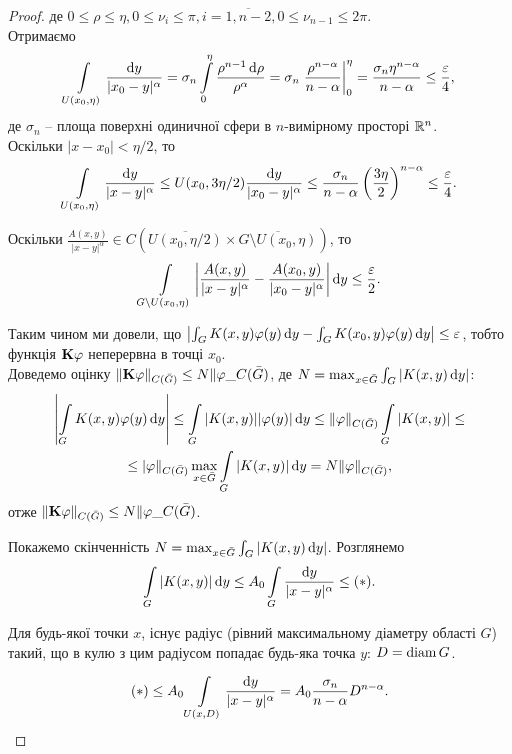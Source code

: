 \begin{proof}
	де $0 \le \rho \le \eta, 0 \le \nu_i \le \pi, i = \overline{1, n - 2}, 0 \le \nu_{n - 1} \le 2 \pi$. \\

	Отримаємо \[ \Int_{U(x_0, \eta)} \dfrac{\diff y}{|x_0 - y|^\alpha} = \sigma_n \Int_0^\eta \dfrac{\rho^{n - 1} \diff \rho}{\rho^\alpha} = \sigma_n \left.\dfrac{\rho^{n - \alpha}}{n - \alpha}\right|_0^\eta = \dfrac{\sigma_n \eta^{n - \alpha}}{n - \alpha} \le \dfrac{\epsilon}{4}, \]
	де $\sigma_n$ -- площа поверхні одиничної сфери в $n$-вимірному просторі $\RR^n$. \\

	Оскільки $|x - x_0| < \eta / 2$, то \[ \Int_{U(x_0, \eta)} \dfrac{\diff y}{|x - y|^\alpha} \le {U(x_0, 3\eta/2)} \dfrac{\diff y}{|x_0 - y|^\alpha} \le \dfrac{\sigma_n}{n - \alpha} \left(\dfrac{3\eta}{2}\right)^{n - \alpha} \le \dfrac{\epsilon}{4}. \] 

	Оскільки $\frac{A(x, y)}{|x - y|^\alpha} \in C\left(\overline{U (x_0, \eta/2)}\times\overline{G \setminus U (x_0, \eta)}\right)$, то
	\[ \Int_{G \setminus U(x_0, \eta)} \left|\dfrac{A(x, y)}{|x - y|^\alpha} - \dfrac{A(x_0, y)}{|x_0 - y|^\alpha}\right| \diff y \le \dfrac{\epsilon}{2}. \]

	Таким чином ми довели, що $\left| \int_G K(x, y) \phi(y) \diff y - \int_G K(x_0, y) \phi(y) \diff y \right| \le \epsilon$, тобто функція $\bf{K}\phi$ неперервна в точці $x_0$. \\

	Доведемо оцінку $\| \bf{K}\phi \|_{C(\bar G)} \le N \|\phi\_{C(\bar G)}$, де $N = \max_{x \in \bar G} \int_G |K(x, y) \diff y|$:
	\begin{multline*}
		\left| \Int_G K(x, y) \phi(y) \diff y \right| \le \Int_G |K(x, y)| |\phi(y)| \diff y \le \|\phi\|_{C(\bar G)} \Int_G |K(x, y)| \le \\
		\le |\phi\|_{C(\bar G)} \Max_{x \in \bar G} \Int_G |K(x, y)| \diff y = N \|\phi\|_{C(\bar G)},
	\end{multline*}
	отже $\| \bf{K}\phi \|_{C(\bar G)} \le N \|\phi\_{C(\bar G)}$.

	Покажемо скінченність $N = \max_{x \in \bar G} \int_G |K(x, y) \diff y|$. Розглянемо \[\Int_G |K(x,y)| \diff y \le A_0 \Int_G \dfrac{\diff y}{|x - y|^\alpha} \le (*).\]

	Для будь-якої точки $x$, існує радіус (рівний максимальному діаметру області $G$) такий, що в кулю з цим радіусом попадає будь-яка точка $y$: $D = \diam G$.

	\[ (*) \le A_0 \Int_{U(x, D)} \dfrac{\diff y}{|x - y|^\alpha} = A_0 \dfrac{\sigma_n}{n - \alpha} D^{n - \alpha}. \]
\end{proof}

